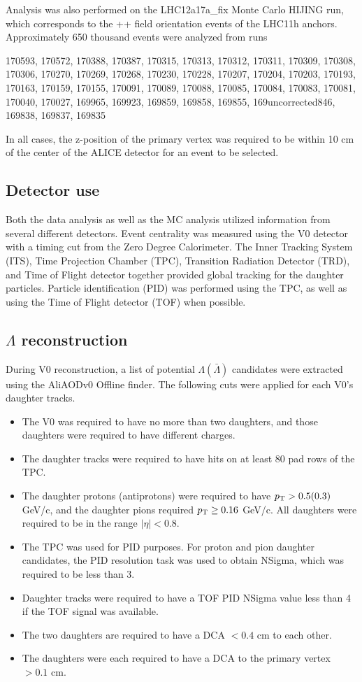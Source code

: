 Analysis was also performed on the LHC12a17a\_fix Monte Carlo HIJING run, which corresponds to the ++ field orientation events of the LHC11h anchors.  Approximately 650 thousand events were analyzed from runs

170593, 170572, 170388, 170387, 170315, 170313, 170312, 170311, 170309, 170308, 170306, 170270, 170269, 170268, 170230, 170228, 170207, 170204, 170203, 170193, 170163, 170159, 170155, 170091, 170089, 170088, 170085, 170084, 170083, 170081, 170040, 170027, 169965, 169923, 169859, 169858, 169855, 169uncorrected846, 169838, 169837, 169835

In all cases, the z-position of the primary vertex was required to be within 10 cm of the center of the ALICE detector for an event to be selected.  

\subsection{Detector use}
Both the data analysis as well as the MC analysis utilized information from several different detectors.  Event centrality was measured using the V0 detector with a timing cut from the Zero Degree Calorimeter.  The Inner Tracking System (ITS), Time Projection Chamber (TPC), Transition Radiation Detector (TRD), and Time of Flight detector together provided global tracking for the daughter particles.  Particle identification (PID) was performed using the TPC, as well as using the Time of Flight detector (TOF) when possible.

\subsection{$\Lambda$ reconstruction}
\label{sec:Recon}

During V0 reconstruction, a list of potential $\Lambda(\bar{\Lambda})$ candidates were extracted using the AliAODv0 Offline finder. The following cuts were applied for each V0's daughter tracks.

\begin{itemize}
\item The V0 was required to have no more than two daughters, and those daughters were required to have different charges.
\item The daughter tracks were required to have hits on at least 80 pad rows of the TPC.
\item The daughter protons (antiprotons) were required to have $p_{\rm T} > 0.5 (0.3)$ GeV/c, and the daughter pions required $p_{\rm T} \geq 0.16$ GeV/c.  All daughters were required to be in the range $|\eta| < 0.8$.
\item The TPC was used for PID purposes.  For proton and pion daughter candidates, the PID resolution task was used to obtain NSigma, which was required to be less than 3.
\item Daughter tracks were required to have a TOF PID NSigma value less than 4 if the TOF signal was available.
\item The two daughters are required to have a DCA $< 0.4$ cm to each other.
\item The daughters were each required to have a DCA to the primary vertex $> 0.1$ cm.
\end{itemize}

